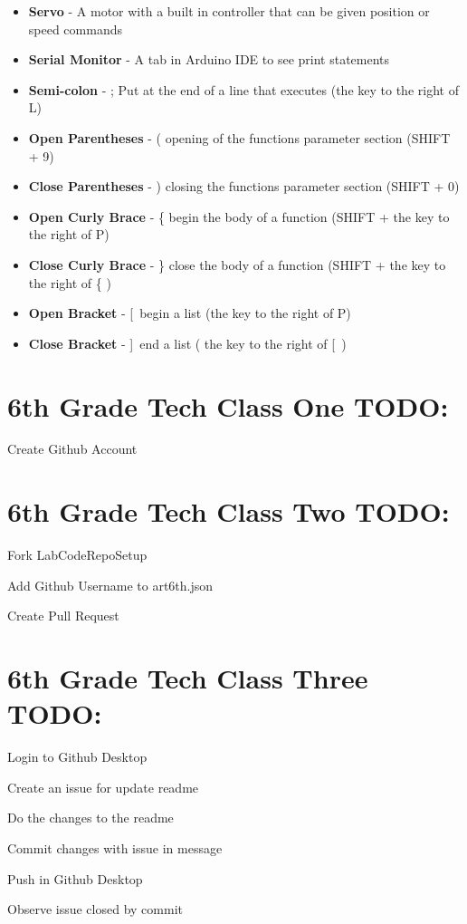 \documentclass{article}
\begin{document}
\begin{itemize}
  \item \textbf{Servo} - A motor with a built in controller that can be given position or speed commands
  \item \textbf{Serial Monitor} - A tab in Arduino IDE to see print statements
  \item \textbf{Semi-colon} - ; Put at the end of a line that executes (the key to the right of L)
  \item \textbf{Open Parentheses} - ( opening of the functions parameter section (SHIFT + 9)
  \item \textbf{Close Parentheses} - ) closing the functions parameter section (SHIFT + 0)
  \item \textbf{Open Curly Brace} - \{ begin the body of a function (SHIFT + the key to the right of P)
  \item \textbf{Close Curly Brace} - \} close the body of a function (SHIFT + the key to the right of \{ )
  \item \textbf{Open Bracket} - [\ begin a list (the key to the right of P)
  \item \textbf{Close Bracket} - ]\ end a list ( the key to the right of [\ )
  
\end{itemize}

\newpage
\section{6th Grade Tech Class One TODO:}
\begin{todolist}
	\item Create Github Account
\end{todolist}


\section{6th Grade Tech Class Two TODO:}
\begin{todolist}
	\item Fork LabCodeRepoSetup
	\item Add Github Username to art6th.json
	\item Create Pull Request
\end{todolist}


\section{6th Grade Tech Class Three TODO:}
\begin{todolist}
	\item Login to Github Desktop
	\item Create an issue for update readme
	\item Do the changes to the readme
	\item Commit changes with issue in message
	\item Push in Github Desktop
	\item Observe issue closed by commit 
\end{todolist}
\end{document}
